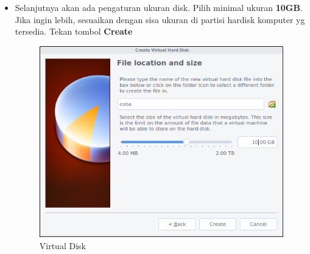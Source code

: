 \documentclass[12pt,]{article}
\begin{document}
\begin{itemize}
		\item Selanjutnya akan ada pengaturan ukuran disk.
		Pilih minimal ukuran \textbf{10GB}. Jika ingin lebih, sesuaikan dengan sisa ukuran di partisi hardisk komputer yg tersedia.
		Tekan tombol \textbf{Create}
		\begin{figure}[H]
			\centering
			\includegraphics[width=0.6\linewidth]{images/vbox_installinux/s2}
			\caption{Virtual Disk}
		\end{figure}
	\end{itemize}
	
\end{document}
